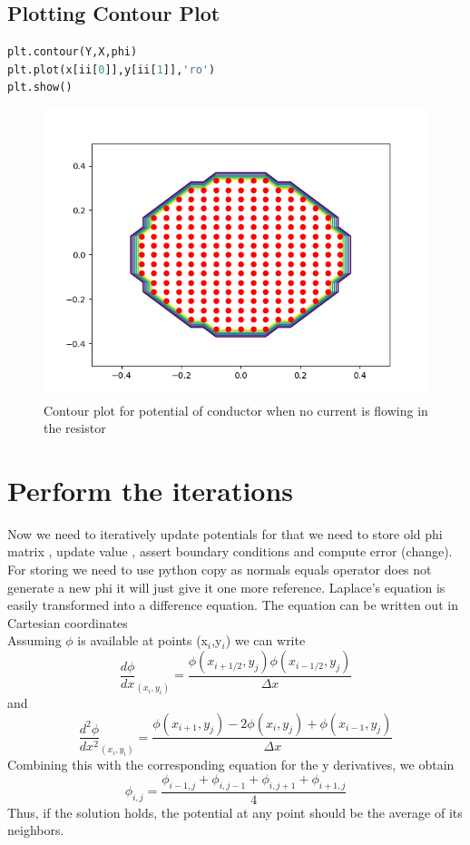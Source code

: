 \documentclass[a4paper]{article}
\begin{document}
\subsection{Plotting Contour Plot}
\begin{lstlisting}[language=Python]
plt.contour(Y,X,phi)
plt.plot(x[ii[0]],y[ii[1]],'ro')
plt.show()
\end{lstlisting}
\begin{figure}
\caption{Contour plot for potential of conductor when no current is flowing in the resistor}
\includegraphics{Figure_1-2.png}
\end{figure}
\section{Perform the iterations}
Now we need to iteratively update potentials for that we need to store old phi matrix , update value , assert boundary conditions and compute error (change).
For storing we need to use python copy as normals equals operator does not generate a new phi it will just give it one more reference.
Laplace’s equation is easily transformed into a difference equation.   The equation can be written out in
Cartesian coordinates
$$$$
Assuming $\phi$ is available at points (x$_{i}$,y$_{i}$)
we can write
$$ \frac{d\phi}{dx}_{(x_{i},y_{i})} = \frac{\phi(x_{i+1/2},y_{j})\phi(x_{i-1/2},y_{j})}{\Delta x} $$
and
$$ \frac{d^{2}\phi}{dx^{2}}_{(x_{i},y_{i})} = \frac{\phi(x_{i+1},y_{j})-2\phi(x_{i},y_{j})+\phi(x_{i-1},y_{j})}{\Delta x} $$
Combining this with the corresponding equation for the y derivatives, we obtain
$$\phi_{i,j} = \frac{\phi_{i-1,j}+\phi_{i,j-1}+\phi_{i,j+1}+\phi_{i+1,j}}{4}$$
Thus, if the solution holds, the potential at any point should be the average of its neighbors.
\end{document}
